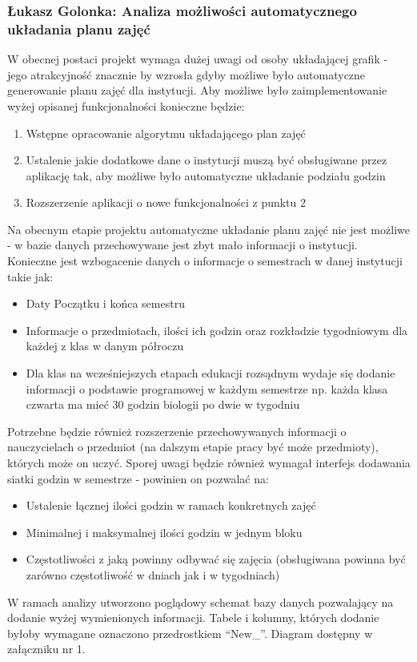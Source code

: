 \documentclass[12pt,a4paper,oneside]{article}
\theoremstyle{definition}
\numberwithin{equation}{section}
\begin{document}
\subsubsection{Łukasz Golonka: Analiza możliwości automatycznego układania planu zajęć}
W obecnej postaci projekt wymaga dużej uwagi od osoby układającej grafik - jego atrakcyjność znacznie by wzrosła gdyby możliwe było automatyczne generowanie planu zajęć dla instytucji.
Aby możliwe było zaimplementowanie wyżej opisanej funkcjonalności konieczne będzie:
\begin{enumerate}
	\item Wstępne opracowanie algorytmu układającego plan zajęć
	\item Ustalenie jakie dodatkowe dane o instytucji muszą być obsługiwane przez aplikację tak, aby możliwe było automatyczne układanie podziału godzin
	\item Rozszerzenie aplikacji o nowe funkcjonalności z punktu 2
\end{enumerate}
Na obecnym etapie projektu automatyczne układanie planu zajęć nie jest możliwe - w bazie danych przechowywane jest zbyt mało informacji o instytucji.
Konieczne jest wzbogacenie danych o informacje o semestrach w danej instytucji takie jak:
\begin{itemize}
	\item Daty Początku i końca semestru
	\item Informacje o przedmiotach, ilości ich godzin oraz rozkładzie tygodniowym dla każdej z klas w danym półroczu
	\item Dla klas na wcześniejszych etapach edukacji rozsądnym wydaje się dodanie informacji o podstawie programowej w każdym semestrze np. każda klasa czwarta ma mieć 30 godzin biologii po dwie w tygodniu
\end{itemize}
Potrzebne będzie również rozszerzenie przechowywanych informacji o nauczycielach o przedmiot (na dalszym etapie pracy być może przedmioty), których może on uczyć.
Sporej uwagi będzie również wymagał interfejs dodawania siatki godzin w semestrze - powinien on pozwalać na:
\begin{itemize}
	\item Ustalenie łącznej ilości godzin w ramach konkretnych zajęć
	\item Minimalnej i maksymalnej ilości godzin w jednym bloku
	\item Częstotliwości z jaką powinny odbywać się zajęcia (obsługiwana powinna być zarówno częstotliwość w dniach jak i w tygodniach)
\end{itemize}
W ramach analizy utworzono poglądowy schemat bazy danych pozwalający na dodanie wyżej wymienionych informacji.
Tabele i kolumny, których dodanie byłoby wymagane oznaczono przedrostkiem ``New\_''.
Diagram dostępny w załączniku nr 1.
\end{document}
